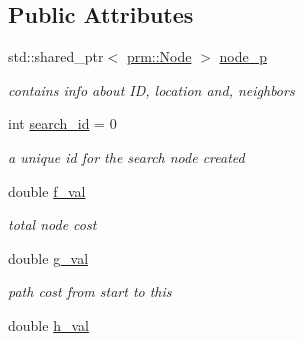 \subsection*{Public Attributes}
\begin{DoxyCompactItemize}
\item 
\mbox{\label{structhsearch_1_1SearchNode_a891ec15f4f07e474fda39978a6ca6902}} 
std\+::shared\+\_\+ptr$<$ \hyperlink{structprm_1_1Node}{prm\+::\+Node} $>$ \hyperlink{structhsearch_1_1SearchNode_a891ec15f4f07e474fda39978a6ca6902}{node\+\_\+p}
\begin{DoxyCompactList}\small\item\em contains info about ID, location and, neighbors \end{DoxyCompactList}\item 
\mbox{\label{structhsearch_1_1SearchNode_ab0e32e34e1e2682c0cc7968df6dd7b85}} 
int \hyperlink{structhsearch_1_1SearchNode_ab0e32e34e1e2682c0cc7968df6dd7b85}{search\+\_\+id} = 0
\begin{DoxyCompactList}\small\item\em a unique id for the search node created \end{DoxyCompactList}\item 
\mbox{\label{structhsearch_1_1SearchNode_a0f9510192452ac5efd6733eadfee38c2}} 
double \hyperlink{structhsearch_1_1SearchNode_a0f9510192452ac5efd6733eadfee38c2}{f\+\_\+val}
\begin{DoxyCompactList}\small\item\em total node cost \end{DoxyCompactList}\item 
\mbox{\label{structhsearch_1_1SearchNode_afc0b32b3c3c748e6585b76fc53553063}} 
double \hyperlink{structhsearch_1_1SearchNode_afc0b32b3c3c748e6585b76fc53553063}{g\+\_\+val}
\begin{DoxyCompactList}\small\item\em path cost from start to this \end{DoxyCompactList}\item 
\mbox{\label{structhsearch_1_1SearchNode_a8e25282237951762ced727eb0097abd9}} 
double \hyperlink{structhsearch_1_1SearchNode_a8e25282237951762ced727eb0097abd9}{h\+\_\+val}

\end{DoxyCompactItemize}
